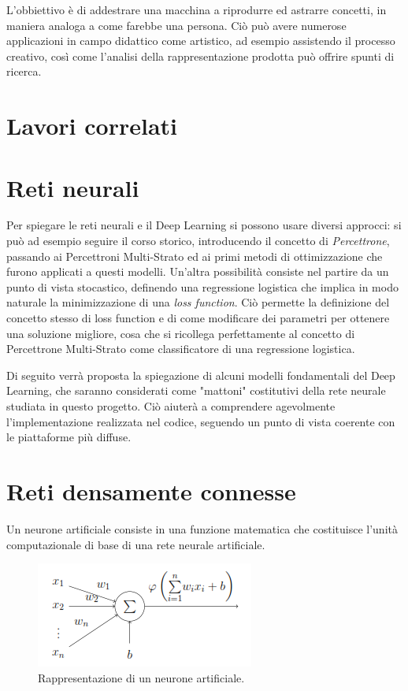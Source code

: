L'obbiettivo è di addestrare una macchina a riprodurre ed astrarre concetti, in maniera analoga a come farebbe una persona. Ciò può avere numerose applicazioni in campo didattico come artistico, ad esempio assistendo il processo creativo, così come l'analisi della rappresentazione prodotta può offrire spunti di ricerca.
\section{Lavori correlati}

\section{Reti neurali}
Per spiegare le reti neurali e il Deep Learning si possono usare diversi approcci: si può ad esempio seguire il corso storico, introducendo il concetto di \textit{Percettrone}, passando ai Percettroni Multi-Strato ed ai primi metodi di ottimizzazione che furono applicati a questi modelli. Un'altra possibilità consiste nel partire da un punto di vista stocastico, definendo una regressione logistica che implica in modo naturale la minimizzazione di una \textit{loss function}. Ciò permette la definizione del concetto stesso di loss function e di come modificare dei parametri per ottenere una soluzione migliore, cosa che si ricollega perfettamente al concetto di Percettrone Multi-Strato come classificatore di una regressione logistica.

Di seguito verrà proposta la spiegazione di alcuni modelli fondamentali del Deep Learning, che saranno considerati come "mattoni" costitutivi della rete neurale studiata in questo progetto. Ciò aiuterà a comprendere agevolmente l'implementazione realizzata nel codice, seguendo un punto di vista coerente con le piattaforme più diffuse.
\section{Reti densamente connesse} %
\label{sec:reti_densamente_connesse}
Un neurone artificiale consiste in una funzione matematica che costituisce l'unità computazionale di base di una rete neurale artificiale.
\begin{figure}[ht]
	\centering
	\includegraphics{img/artificial_neuron.PNG}
	\caption{Rappresentazione di un neurone artificiale.}
	\label{fig:1.2}
\end{figure}

